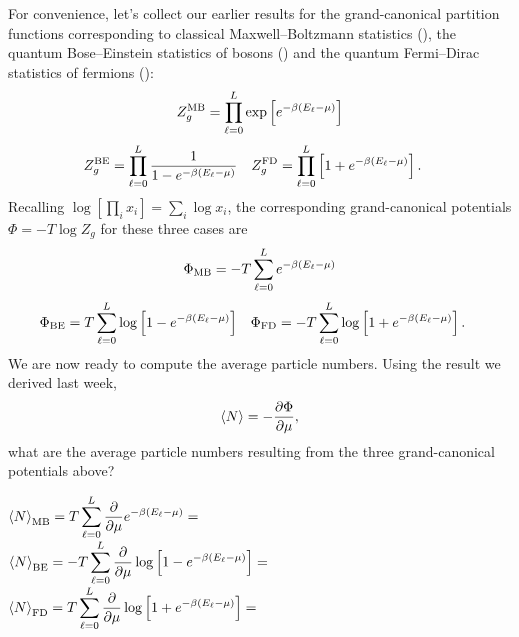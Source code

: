 For convenience, let's collect our earlier results for the grand-canonical partition functions corresponding to classical Maxwell--Boltzmann statistics (), the quantum Bose--Einstein statistics of bosons () and the quantum Fermi--Dirac statistics of fermions ():
\begin{equation*}
  Z_g^{\text{MB}} = \prod_{\ell = 0}^L \exp\left[e^{-\beta\left(E_{\ell} - \mu\right)}\right]
\end{equation*}
\begin{align*}
  Z_g^{\text{BE}} & = \prod_{\ell = 0}^L \frac{1}{1 - e^{-\beta (E_{\ell} - \mu)}} &
  Z_g^{\text{FD}} & = \prod_{\ell = 0}^L \left[1 + e^{-\beta (E_{\ell} - \mu)}\right].
\end{align*}
Recalling $\log\left[\prod_i x_i\right] = \sum_i \log x_i$, the corresponding grand-canonical potentials $\Phi = -T \log Z_g$ for these three cases are
\begin{equation*}
  \Phi_{\text{MB}} = -T \sum_{\ell = 0}^L e^{-\beta\left(E_{\ell} - \mu\right)}
\end{equation*}
\begin{align*}
  \Phi_{\text{BE}} & =  T \sum_{\ell = 0}^L \log\left[1 - e^{-\beta (E_{\ell} - \mu)}\right] &
  \Phi_{\text{FD}} & = -T \sum_{\ell = 0}^L \log\left[1 + e^{-\beta (E_{\ell} - \mu)}\right].
\end{align*}
We are now ready to compute the average particle numbers.
Using the result we derived last week,
\begin{equation*}
  \left\langle N \right\rangle = -\frac{\partial \Phi}{\partial \mu},
\end{equation*}
what are the average particle numbers resulting from the three grand-canonical potentials above?
\begin{mdframed}
  $\displaystyle \left\langle N \right\rangle_{\text{MB}} =  T \sum_{\ell = 0}^L \frac{\partial }{\partial \mu} e^{-\beta\left(E_{\ell} - \mu\right)} = $ \\[100 pt]
  $\displaystyle \left\langle N \right\rangle_{\text{BE}} = -T \sum_{\ell = 0}^L \frac{\partial }{\partial \mu} \log\left[1 - e^{-\beta (E_{\ell} - \mu)}\right] = $ \\[100 pt]
  $\displaystyle \left\langle N \right\rangle_{\text{FD}} =  T \sum_{\ell = 0}^L \frac{\partial }{\partial \mu} \log\left[1 + e^{-\beta (E_{\ell} - \mu)}\right] = $ \\[100 pt]
\end{mdframed}

